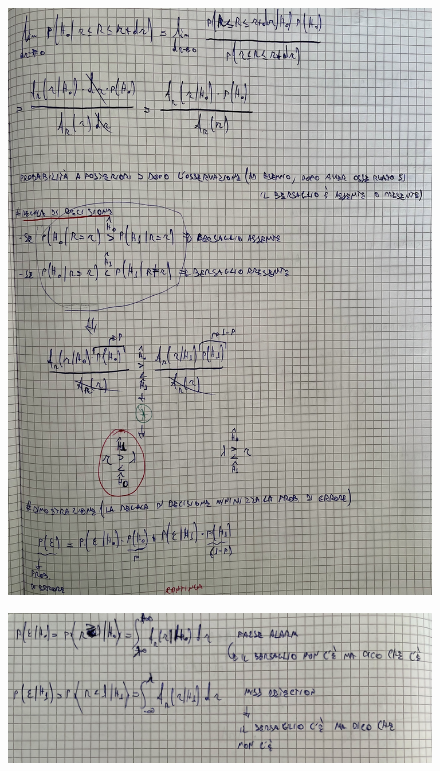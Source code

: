 \documentclass{article}
\begin{document}
\begin{figure}[H]
\centering
\includegraphics[scale=0.10]{ese/24a.jpeg}
\end{figure} 
\begin{figure}[H]
\centering
\includegraphics[scale=0.10]{ese/24b.jpeg}
\end{figure} 
\end{document}
